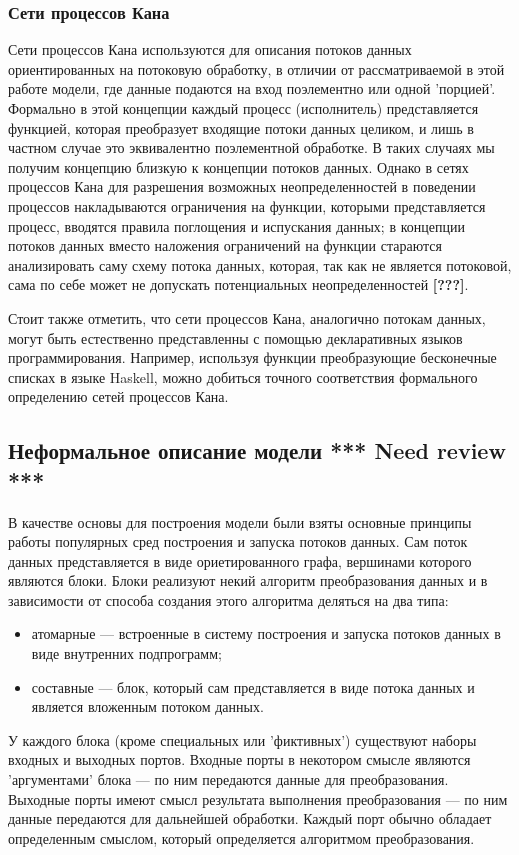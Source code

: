 \documentclass[10pt,a4paper]{article}
\begin{document}
\subsubsection{Сети процессов Кана}
Сети процессов Кана используются для описания потоков данных ориентированных на потоковую обработку, в отличии от рассматриваемой в этой работе
модели, где данные подаются на вход поэлементно или одной 'порцией'.
Формально в этой концепции каждый процесс (исполнитель) представляется функцией, которая преобразует входящие потоки данных целиком, и лишь
в частном случае это эквивалентно поэлементной обработке.
В таких случаях мы получим концепцию близкую к концепции потоков данных. Однако в сетях процессов Кана для разрешения возможных неопределенностей в 
поведении процессов накладываются ограничения на функции, которыми представляется процесс, вводятся правила поглощения и испускания данных; в концепции потоков данных вместо наложения ограничений на функции стараются анализировать саму схему потока данных, которая, так как не является потоковой, сама по себе может не допускать потенциальных неопределенностей \textbf{[???]}.

Стоит также отметить, что сети процессов Кана, аналогично потокам данных,
могут быть естественно представленны с помощью декларативных языков программирования.
Например, используя функции преобразующие бесконечные списках в языке Haskell, можно добиться точного соответствия формального определению сетей процессов Кана. 

\subsection{Неформальное описание модели \textbf{*** Need review ***}}

В качестве основы для построения модели были взяты основные принципы работы популярных сред построения и запуска потоков данных.
Сам поток данных представляется в виде ориетированного графа, вершинами которого являются блоки.
Блоки реализуют некий алгоритм преобразования данных и в зависимости от способа создания этого алгоритма деляться на два типа:
\begin{itemize}
  \item атомарные --- встроенные в систему построения и запуска потоков данных в виде внутренних подпрограмм;
  \item составные --- блок, который сам представляется в виде потока данных и является вложенным потоком данных.
\end{itemize}
У каждого блока (кроме специальных или 'фиктивных') существуют наборы входных и выходных портов. Входные порты в некотором смысле являются 'аргументами' блока ---
по ним передаются данные для преобразования. Выходные порты имеют смысл результата выполнения преобразования --- по ним данные передаются для дальнейшей обработки.
Каждый порт обычно обладает определенным смыслом, который определяется алгоритмом преобразования.
\end{document}
